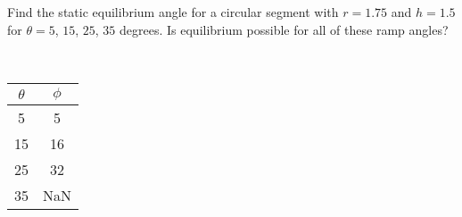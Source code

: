Find the static equilibrium angle for a circular segment with $r=1.75$ and $h=1.5$ for $\theta=5$, $15$, $25$, $35$ degrees. Is equilibrium possible for all of these ramp angles?

\begin{solution}\
\begin{center}
\begin{tabular}{ c|c }
    $\theta$ & $\phi$ \\
    \hline
    5 & 5 \\
    15 & 16 \\
    25 & 32 \\
    35 & NaN \\
\end{tabular}
\end{center}
\end{solution}